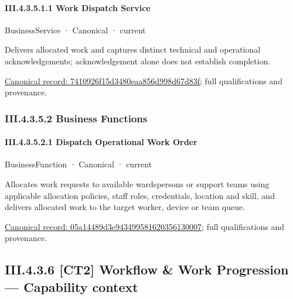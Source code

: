 \paragraph*{III.4.3.5.1.1 Work Dispatch Service}
\label{navigation:III.4.3.5.1.1}

\label{element:7410926f15d3480eaa856d998d67d83f}
{\small BusinessService · Canonical · current}\par

Delivers allocated work and captures distinct technical and operational acknowledgements; acknowledgement alone does not establish completion.


{\footnotesize \href{../../../../continuum/business/business-service/7410926f15d3480eaa856d998d67d83f.md}{Canonical record: 7410926f15d3480eaa856d998d67d83f}; full qualifications and provenance.}\par
\subsubsection*{III.4.3.5.2 Business Functions}
\label{navigation:III.4.3.5.2}

\paragraph*{III.4.3.5.2.1 Dispatch Operational Work Order}
\label{navigation:III.4.3.5.2.1}

\label{element:05a14489d3e943499581620356130007}
{\small BusinessFunction · Canonical · current}\par

Allocates work requests to available wardspersons or support teams using applicable allocation policies, staff roles, credentials, location and skill, and delivers allocated work to the target worker, device or team queue.


{\footnotesize \href{../../../../continuum/business/business-function/05a14489d3e943499581620356130007.md}{Canonical record: 05a14489d3e943499581620356130007}; full qualifications and provenance.}\par
\subsection*{III.4.3.6 [CT2] Workflow \& Work Progression — Capability context}
\label{navigation:III.4.3.6}

